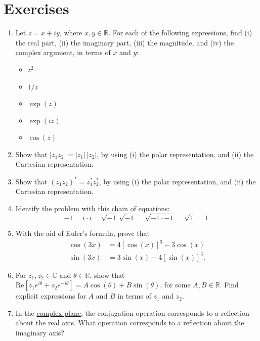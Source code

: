 \documentclass[10pt,a4paper]{article}
\begin{document}
\section{Exercises}

\begin{enumerate}
\item
  Let $z = x + iy$, where $x, y \in \mathbb{R}$. For each of the
  following expressions, find (i) the real part, (ii) the imaginary
  part, (iii) the magnitude, and (iv) the complex argument, in terms
  of $x$ and $y$:
  \begin{itemize}
  \item $z^2$
  \item $1/z$
  \item $\exp(z)$
  \item $\exp(iz)$
  \item $\cos(z)$
  \end{itemize}

\item
Show that $|z_1 z_2| = |z_1|\, |z_2|$, by using (i) the polar
representation, and (ii) the Cartesian representation.

\item
  Show that $(z_1 z_2)^* = z_1^* z_2^*$, by using (i) the polar
  representation, and (ii) the Cartesian representation.

\item
  Identify the problem with this chain of equations:
  \begin{equation*}
    -1 = i \cdot i =
    \sqrt{-1}\,\sqrt{-1} = \sqrt{-1 \cdot -1} = \sqrt{1} = 1.    
  \end{equation*}

\item
  With the aid of Euler's formula, prove that
  \begin{align}
    \cos(3x) &= 4[\cos(x)]^3 -3\cos(x)\\
    \sin(3x) &= 3\sin(x)-4[\sin(x)]^3.
  \end{align}

\item
  For $z_1, z_2 \in \mathbb{C}$ and $\theta \in \mathbb{R}$, show that
  $\mathrm{Re}\left[z_1 e^{i\theta} + z_2 e^{-i\theta}\right] = A
  \cos(\theta) + B \sin(\theta)$, for some $A, B \in \mathbb{R}$. Find
  explicit expressions for $A$ and $B$ in terms of $z_1$ and $z_2$.

\item
  In the \hyperref[the-complex-plane]{complex plane}, the conjugation
  operation corresponds to a reflection about the real axis. What
  operation corresponds to a reflection about the imaginary axis?


\end{enumerate}
\end{document}
